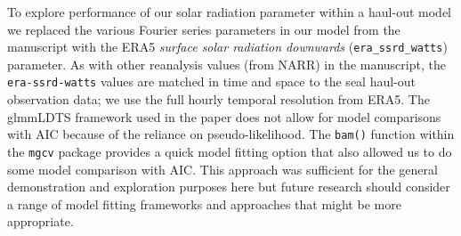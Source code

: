 \documentclass[fleqn,10pt,lineno]{wlpeerj} %
\newenvironment{Shaded}{\begin{snugshade}}{\end{snugshade}}
\newcommand{\AttributeTok}[1]{\textcolor[rgb]{0.13,0.29,0.53}{#1}}
\newcommand{\CommentTok}[1]{\textcolor[rgb]{0.56,0.35,0.01}{\textit{#1}}}
\newcommand{\ControlFlowTok}[1]{\textcolor[rgb]{0.13,0.29,0.53}{\textbf{#1}}}
\newcommand{\DecValTok}[1]{\textcolor[rgb]{0.00,0.00,0.81}{#1}}
\newcommand{\FunctionTok}[1]{\textcolor[rgb]{0.13,0.29,0.53}{\textbf{#1}}}
\newcommand{\NormalTok}[1]{#1}
\newcommand{\OtherTok}[1]{\textcolor[rgb]{0.56,0.35,0.01}{#1}}
\newcommand{\SpecialCharTok}[1]{\textcolor[rgb]{0.81,0.36,0.00}{\textbf{#1}}}
\newcommand{\StringTok}[1]{\textcolor[rgb]{0.31,0.60,0.02}{#1}}
\begin{document}
\begin{Shaded}
\end{Shaded}

To explore performance of our solar radiation parameter within a haul-out model
we replaced the various Fourier series parameters in our model from the manuscript
with the ERA5 \emph{surface solar radiation downwards} (\texttt{era\_ssrd\_watts}) parameter. As
with other reanalysis values (from NARR) in the manuscript, the \texttt{era-ssrd-watts}
values are matched in time and space to the seal haul-out observation data; we
use the full hourly temporal resolution from ERA5. The glmmLDTS framework used
in the paper does not allow for model comparisons with AIC because of
the reliance on pseudo-likelihood. The \texttt{bam()} function within the \texttt{mgcv} package
provides a quick model fitting option that also allowed us to do some model
comparison with AIC. This approach was sufficient for the general demonstration and
exploration purposes here
but future research should consider a range of model fitting frameworks and
approaches that might be more appropriate.
\end{document}
